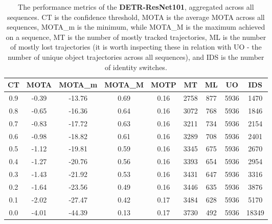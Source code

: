\begin{table}[h]
    \centering
    \begin{tabular}{|c||c|c|c|c|c|c|c|c|}
        \hline
        CT & MOTA & MOTA\_m & MOTA\_M & MOTP & MT & ML & UO & IDS \\
        \hline
        \hline
        0.9 & -0.39 & -13.76 & 0.69 & 0.16 & 2758 & 877 & 5936 & 1470 \\
        \hline 
        0.8 & -0.65 & -16.36 & 0.64 & 0.16 & 3072 & 768 & 5936 & 1846 \\
        \hline 
        0.7 & -0.83 & -17.72 & 0.63 & 0.16 & 3211 & 734 & 5936 & 2154 \\
        \hline 
        0.6 & -0.98 & -18.82 & 0.61 & 0.16 & 3289 & 708 & 5936 & 2401 \\
        \hline 
        0.5 & -1.12 & -19.81 & 0.59 & 0.16 & 3345 & 675 & 5936 & 2670 \\
        \hline 
        0.4 & -1.27 & -20.76 & 0.56 & 0.16 & 3393 & 654 & 5936 & 2954 \\
        \hline 
        0.3 & -1.43 & -21.92 & 0.53 & 0.16 & 3431 & 647 & 5936 & 3316 \\
        \hline 
        0.2 & -1.64 & -23.56 & 0.49 & 0.16 & 3446 & 635 & 5936 & 3876 \\
        \hline 
        0.1 & -2.02 & -27.47 & 0.42 & 0.17 & 3484 & 628 & 5936 & 5170 \\
        \hline 
        0.0 & -4.01 & -44.39 & 0.13 & 0.17 & 3730 & 492 & 5936 & 18349 \\
        \hline  
    \end{tabular}
    \caption{The performance metrics of the \textbf{DETR-ResNet101}, aggregated across all sequences. CT is the confidence threshold, MOTA is the average MOTA across all sequences, MOTA\_m is the minimum, while MOTA\_M is the maximum achieved on a sequence, MT is the number of mostly tracked trajectories, ML is the number of mostly lost trajectories (it is worth inspecting these in relation with UO - the number of unique object trajectories across all sequences), and IDS is the number of identity switches.}
    \label{tab:mota_detr101}
\end{table}